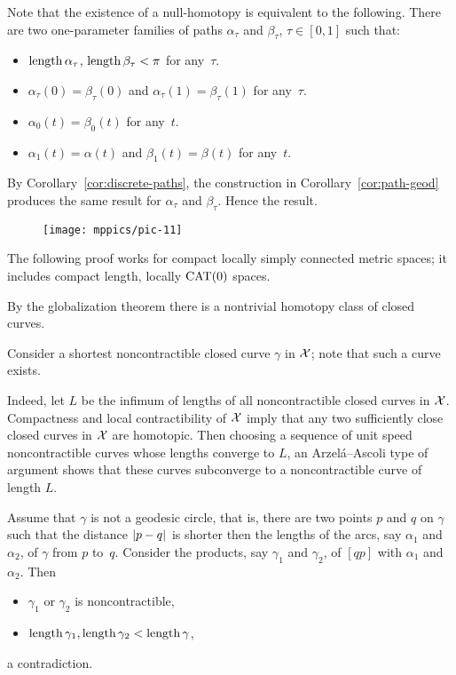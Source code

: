 Note that the existence of a null-homotopy is equivalent to the following.
There are two one-parameter families of paths $\alpha_\tau$ and $\beta_\tau$, $\tau\in[0,1]$ 
such that: 
\begin{itemize}
\item $\mathop{\rm length}\nolimits\alpha_\tau$, $\mathop{\rm length}\nolimits\beta_\tau<\pi$ for any~$\tau$.
\item $\alpha_\tau(0)=\beta_\tau(0)$ and $\alpha_\tau(1)=\beta_\tau(1)$ for any~$\tau$.
\item $\alpha_0(t)=\beta_0(t)$ for any~$t$.
\item $\alpha_1(t)=\alpha(t)$ and $\beta_1(t)=\beta(t)$ for any~$t$.
\end{itemize}

By Corollary~\ref{cor:discrete-paths},
the construction in Corollary~\ref{cor:path-geod} produces the same result for $\alpha_\tau$ and $\beta_\tau$.
Hence the result.


\begin{wrapfigure}{r}{25 mm}
\vskip-4mm
\centering
\texttt{[image: mppics/pic-11]}
\end{wrapfigure}

The following proof works for compact locally simply connected metric spaces;
it includes compact length, locally $\mathrm{CAT}(0)$ spaces. 

\medskip


By the globalization theorem there is  a nontrivial homotopy class of closed curves.

Consider a shortest noncontractible closed curve $\gamma$ in  $\mathcal{X}$;
note that such a curve exists.

Indeed, let $L$ be the infimum of lengths of all noncontractible closed curves in $\mathcal{X}$.
Compactness and local contractibility of $\mathcal{X}$ imply that any two sufficiently close closed curves in $\mathcal{X}$ are homotopic.
Then choosing a sequence of unit speed noncontractible curves whose lengths converge to $L$, an Arzel\'{a}--Ascoli type of argument shows that these curves subconverge to a noncontractible curve of length $L$.


Assume that $\gamma$ is not a geodesic circle,
that is,  there are two points $p$ and $q$ on $\gamma$ such that the distance $\dist{p}{q}{}$ 
is shorter then the lengths of the arcs, say $\alpha_1$ and $\alpha_2$, of $\gamma$ from $p$ to~$q$.
Consider the products, say $\gamma_1$ and $\gamma_2$,
of $[qp]$ with $\alpha_1$ and~$\alpha_2$.
Then
\begin{itemize}
 \item  $\gamma_1$ or $\gamma_2$ is noncontractible,
 \item $\mathop{\rm length}\nolimits\gamma_1, \mathop{\rm length}\nolimits\gamma_2<\mathop{\rm length}\nolimits \gamma$,
\end{itemize}
a contradiction.

